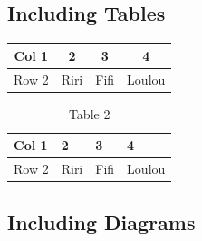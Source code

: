 \subsection{Including Tables}


\begin{center}
\begin{tabular}{|c||c|c|c|}
\hline 
Col 1 & 2 & 3 & 4 \\ 
\hline 
Row 2 & Riri & Fifi & Loulou \\ 
\hline 
\end{tabular} 
\end{center}


\begin{table}[h!]
\begin{tabularx}{13 cm}{|X|m{3cm}|m{3cm}|m{3cm}|}
\hline 
Col 1 & 2 & 3 & 4 \\ 
\hline 
Row 2 & Riri & Fifi & Loulou \\ 
\hline 
\end{tabularx} 
\caption{Table 2}
\label{table 2}
\end{table}

\subsection{Including Diagrams}


